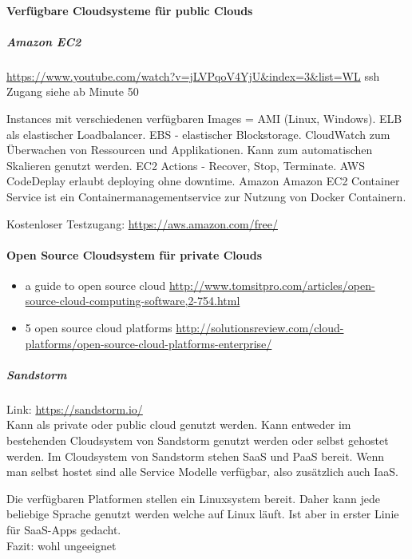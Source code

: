 \documentclass[a4paper,10pt]{article}
\numberwithin{figure}{section}
\numberwithin{table}{section}
\begin{document}
\paragraph{Verfügbare Cloudsysteme für public Clouds}

\subparagraph{Amazon EC2}

\url{https://www.youtube.com/watch?v=jLVPqoV4YjU&index=3&list=WL}
ssh Zugang siehe ab Minute 50

Instances mit verschiedenen verfügbaren Images = AMI (Linux, Windows).
ELB als elastischer Loadbalancer.
EBS - elastischer Blockstorage.
CloudWatch zum Überwachen von Ressourcen und Applikationen.
Kann zum automatischen Skalieren genutzt werden.
EC2 Actions - Recover, Stop, Terminate.
AWS CodeDeplay erlaubt deploying ohne downtime.
Amazon
Amazon EC2 Container Service ist ein Containermanagementservice zur Nutzung von Docker Containern.

Kostenloser Testzugang: \url{https://aws.amazon.com/free/}

\paragraph{Open Source Cloudsystem für private Clouds}

\begin{itemize}
 \item a guide to open source cloud \url{http://www.tomsitpro.com/articles/open-source-cloud-computing-software,2-754.html}
 \item 5 open source cloud platforms \url{http://solutionsreview.com/cloud-platforms/open-source-cloud-platforms-enterprise/}
\end{itemize}

\subparagraph{Sandstorm}

Link: \url{https://sandstorm.io/}\\

Kann als private oder public cloud genutzt werden.
Kann entweder im bestehenden Cloudsystem von Sandstorm genutzt werden oder selbst gehostet werden.
Im Cloudsystem von Sandstorm stehen SaaS und PaaS bereit.
Wenn man selbst hostet sind alle Service Modelle verfügbar, also zusätzlich auch IaaS.

Die verfügbaren Platformen stellen ein Linuxsystem bereit.
Daher kann jede beliebige Sprache genutzt werden welche auf Linux läuft.
Ist aber in erster Linie für SaaS-Apps gedacht.\\

Fazit:
wohl ungeeignet
\end{document}
